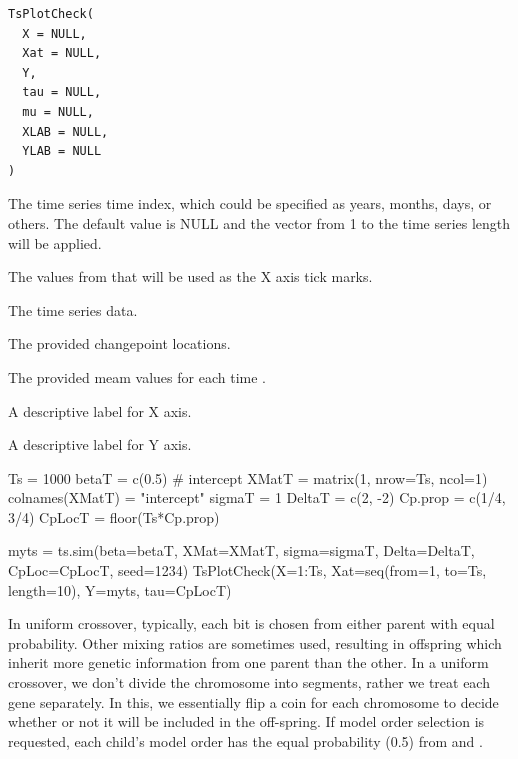 \documentclass[a4paper]{book}
\begin{document}
%
\begin{Usage}
\begin{verbatim}
TsPlotCheck(
  X = NULL,
  Xat = NULL,
  Y,
  tau = NULL,
  mu = NULL,
  XLAB = NULL,
  YLAB = NULL
)
\end{verbatim}
\end{Usage}
%
\begin{Arguments}
\begin{ldescription}
\item[\code{X}] The time series time index, which could be specified as years, months, days, or others.
The default value is NULL and the vector from 1 to the time series length will be applied.

\item[\code{Xat}] The values from  that will be used as the X axis tick marks.

\item[\code{Y}] The time series data.

\item[\code{tau}] The provided changepoint locations.

\item[\code{mu}] The provided meam values for each time .

\item[\code{XLAB}] A descriptive label for X axis.

\item[\code{YLAB}] A descriptive label for Y axis.
\end{ldescription}
\end{Arguments}
%
\begin{Examples}
\begin{ExampleCode}
Ts = 1000
betaT = c(0.5) # intercept
XMatT = matrix(1, nrow=Ts, ncol=1)
colnames(XMatT) = "intercept"
sigmaT = 1
DeltaT = c(2, -2)
Cp.prop = c(1/4, 3/4)
CpLocT = floor(Ts*Cp.prop)

myts = ts.sim(beta=betaT, XMat=XMatT, sigma=sigmaT, Delta=DeltaT, CpLoc=CpLocT, seed=1234)
TsPlotCheck(X=1:Ts, Xat=seq(from=1, to=Ts, length=10), Y=myts, tau=CpLocT)
\end{ExampleCode}
\end{Examples}
%
\begin{Description}
In uniform crossover, typically, each bit is chosen from either parent with
equal probability. Other mixing ratios are sometimes used, resulting in
offspring which inherit more genetic information from one parent than the
other. In a uniform crossover, we don’t divide the chromosome into segments,
rather we treat each gene separately. In this, we essentially flip a coin
for each chromosome to decide whether or not it will be included in the
off-spring. If model order selection is requested, each child's model order
has the equal probability (0.5) from  and .
\end{Description}
\end{document}
